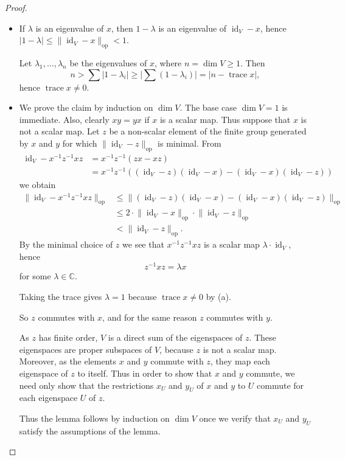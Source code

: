\documentclass[10pt,a4paper]{amsart}
\newcommand*{\CC}{\mathbb C}
\newcommand*{\abs}[1]{\lvert#1\rvert}
\DeclareMathOperator{\id}{id}
\newcommand*{\normop}[1]{\lVert#1\rVert_\text{op}}
\DeclareMathOperator{\trace}{trace}
\begin{document}
\begin{proof}
  \begin{itemize}
  \item[(a)] If $\lambda$ is an eigenvalue of $x$, then $1-\lambda$ is
    an eigenvalue of $\id_V-x$, hence
    $\abs{1-\lambda}\le\normop{\id_V-x}<1$.

    Let $\lambda_1,\dots,\lambda_n$ be the eigenvalues of $x$,
    where $n=\dim V\ge1$. Then
    \[
      n %
      > \sum\abs{1-\lambda_i}%
       \ge \abs{\sum(1-\lambda_i)}%
      =\abs{n-\trace x},
    \]
    hence $\trace x\ne0$.
  \item[(b)] We prove the claim by induction on $\dim V$. The base
    case $\dim V=1$ is immediate. Also, clearly $xy=yx$ if $x$ is a
    scalar map. Thus suppose that $x$ is not a scalar map. Let $z$ be
    a non-scalar element of the finite group generated by $x$ and $y$
    for which $\normop{\id_V-z}$ is minimal. From
  \begin{align*}
    \id_V-x^{-1}z^{-1}xz%
    &=x^{-1}z^{-1}(zx-xz)\\
    &=x^{-1}z^{-1}\left((\id_V-z)(\id_V-x)-(\id_V-x)(\id_V-z)\right)
  \end{align*}
  we obtain
  \begin{align*}
    \normop{\id_V-x^{-1}z^{-1}xz}%
    &\le \normop{(\id_V-z)(\id_V-x)-(\id_V-x)(\id_V-z)}\\
    &\le2 \cdot\normop{\id_V-x}\cdot\normop{\id_V-z}\\
    &< \normop{\id_V-z}.
  \end{align*}
  By the minimal choice of $z$ we see that $x^{-1}z^{-1}xz$ is a
  scalar map $\lambda\cdot\id_V$, hence
  \[
    z^{-1}xz=\lambda x
  \]
  for some $\lambda\in\CC$.
  
  Taking the trace gives $\lambda=1$ because $\trace x\ne0$ by (a).

  So $z$ commutes with $x$, and for the same reason $z$ commutes with
  $y$.

  As $z$ has finite order, $V$ is a direct sum of the eigenspaces of
  $z$. These eigenspaces are proper subspaces of $V$, because $z$ is
  not a scalar map. Moreover, as the elements $x$ and $y$ commute with
  $z$, they map each eigenspace of $z$ to itself. Thus in order to
  show that $x$ and $y$ commute, we need only show that the
  restrictions $x_U$ and $y_U$ of $x$ and $y$ to $U$ commute for each
  eigenspace $U$ of $z$.

  Thus the lemma follows by induction on $\dim V$ once we verify that
  $x_U$ and $y_U$ satisfy the assumptions of the lemma.


\end{itemize}
\end{proof}
\end{document}
